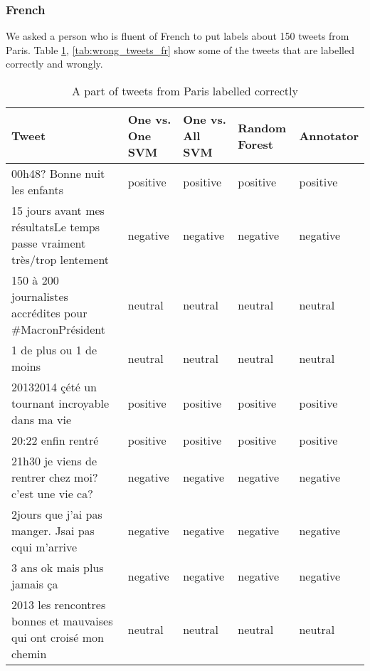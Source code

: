 \subsubsection{French}
We asked a person who is fluent of French to put labels about 150 tweets from Paris.
Table \ref{tab:correct_tweets_fr}, \ref{tab:wrong_tweets_fr}  show some of the tweets that are labelled correctly and wrongly.
\begin{table}[ht]
	\caption{A part of tweets from Paris labelled correctly}
	\begin{tabular}{|p{5cm}|p{1.8cm}|p{1.8cm}|p{1.8cm}|p{1.8cm}|} \hline
	Tweet & One vs. One SVM &One vs. All SVM &Random Forest & Annotator\\ \hline

	00h48? Bonne nuit les enfants &positive & positive &positive & positive \\ \hline
	15 jours avant mes r\'esultatsLe temps passe vraiment tr\`es/trop lentement & negative& negative& negative& negative \\ \hline
	150 \`a 200 journalistes accr\'edites pour \#MacronPr\'esident & neutral & neutral& neutral& neutral\\ \hline
	1 de plus ou 1 de moins & neutral& neutral& neutral& neutral \\ \hline
	20132014 \c c\'et\'e un tournant incroyable dans ma vie &positive&positive&positive&positive \\ \hline

	20:22 enfin rentr\'e &positive&positive&positive&positive \\ \hline
	21h30 je viens de rentrer chez moi? c'est une vie ca? &negative &negative&negative&negative\\ \hline
	2jours que j'ai pas manger. Jsai pas cqui m'arrive &negative &negative&negative&negative\\ \hline
	3 ans ok mais plus jamais \c ca &negative &negative&negative&negative\\ \hline
	2013 les rencontres bonnes et mauvaises qui ont crois\'e mon chemin &neutral&neutral&neutral&neutral\\ \hline


	\end{tabular}
	\label{tab:correct_tweets_fr}
\end{table}


